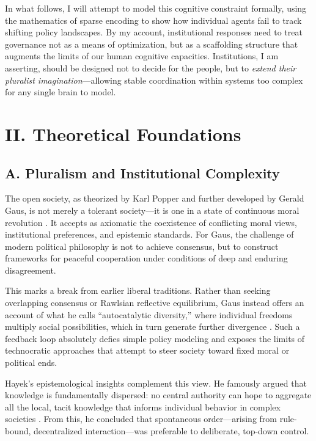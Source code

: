 \documentclass[12pt]{article}  %
\begin{document}
In what follows, I will attempt to model this cognitive constraint formally, using the mathematics of sparse encoding to show how individual agents fail to track shifting policy landscapes. By my account, institutional responses need to treat governance not as a means of optimization, but as a scaffolding structure that augments the limits of our human cognitive capacities. Institutions, I am asserting, should be designed not to decide for the people, but to \textit{extend their pluralist imagination}—allowing stable coordination within systems too complex for any single brain to model.

\section*{II. Theoretical Foundations}

\subsection*{A. Pluralism and Institutional Complexity}

The open society, as theorized by Karl Popper and further developed by Gerald Gaus, is not merely a tolerant society—it is one in a state of continuous moral revolution \parencite{gaus2021open, popper1945open}. It accepts as axiomatic the coexistence of conflicting moral views, institutional preferences, and epistemic standards. For Gaus, the challenge of modern political philosophy is not to achieve consensus, but to construct frameworks for peaceful cooperation under conditions of deep and enduring disagreement.

This marks a break from earlier liberal traditions. Rather than seeking overlapping consensus or Rawlsian reflective equilibrium, Gaus instead offers an account of what he calls “autocatalytic diversity,” where individual freedoms multiply social possibilities, which in turn generate further divergence \parencite{gaus2021open}. Such a feedback loop absolutely defies simple policy modeling and exposes the limits of technocratic approaches that attempt to steer society toward fixed moral or political ends.

Hayek’s epistemological insights complement this view. He famously argued that knowledge is fundamentally dispersed: no central authority can hope to aggregate all the local, tacit knowledge that informs individual behavior in complex societies \parencite{hayek1945use}. From this, he concluded that spontaneous order—arising from rule-bound, decentralized interaction—was preferable to deliberate, top-down control.
\end{document}
